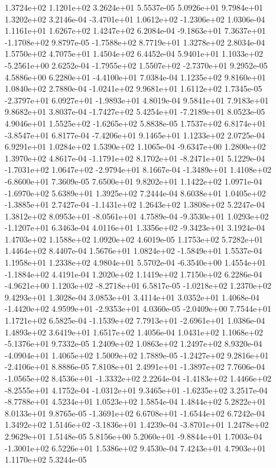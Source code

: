 1.3724e+02 1.1201e+02 3.2624e+01  5.5537e-05
5.0926e+01 9.7984e+01 1.3202e+02  3.2146e-04
-3.4701e+01  1.0612e+02 -1.2306e+02  1.0306e-04
1.1161e+01 1.6267e+02 1.4247e+02  6.2084e-04
-9.1863e+01  7.3637e+01 -1.1708e+02  9.8797e-05
-1.7588e+02  8.7719e+01  1.3278e+02  2.8034e-04
1.5750e+02 4.7075e+01 1.4504e+02  6.4452e-04
 5.9401e+01  1.1033e+02 -5.2561e+00  2.6252e-04
-1.7955e+02  1.5507e+02 -2.7370e+01  9.2952e-05
 4.5886e+00  6.2280e+01 -4.4100e+01  7.0384e-04
1.1235e+02 9.8160e+01 1.0840e+02  2.7880e-04
-1.0241e+02  9.9681e+01  1.6112e+02  1.7345e-05
-2.3797e+01  6.0927e+01 -1.9893e+01  4.8019e-04
9.5841e+01 7.9183e+01 9.8682e+01  3.8037e-04
-1.7427e+02  5.4254e+01 -7.2189e+01  8.0523e-05
 4.9046e+01  1.5525e+02 -1.6265e+02  5.8838e-05
 1.7537e+02  6.8174e+01 -3.8547e+01  6.8177e-04
-7.4206e+01  9.1465e+01  1.1233e+02  2.0725e-04
6.9291e+01 1.0284e+02 1.5390e+02  1.1065e-04
-9.6347e+00  1.2800e+02  1.3970e+02  4.8617e-04
-1.1791e+02  8.1702e+01 -8.2471e+01  5.1229e-04
-1.7031e+02  1.0647e+02 -2.9794e+01  8.1667e-04
-1.3489e+01  1.4108e+02 -6.8600e+01  7.3609e-05
7.6500e+01 9.8202e+01 1.1422e+02  1.0971e-04
-1.6970e+02  5.6389e+01  1.3925e+02  7.2444e-04
 8.6038e+01  1.0405e+02 -1.3885e+01  2.7427e-04
-1.1431e+02  1.2643e+02  1.3808e+02  5.2247e-04
 1.3812e+02  8.0953e+01 -8.0561e+01  4.7589e-04
-9.3530e+01  1.0293e+02 -1.1207e+01  6.3463e-04
 4.0116e+01  1.3356e+02 -9.3423e+01  3.1924e-04
1.4703e+02 1.1588e+02 1.0920e+02  4.6019e-05
1.1753e+02 5.7282e+01 1.4464e+02  8.4407e-04
 1.5676e+01  1.0824e+02 -1.5849e+01  1.5537e-04
1.1958e+01 1.2338e+02 4.9804e+01  5.5702e-04
-6.3540e+00  1.4554e+01 -1.1884e+02  4.4191e-04
1.2020e+02 1.1419e+02 1.7150e+02  6.2286e-04
-4.9621e+00  1.1203e+02 -8.2718e+01  6.5817e-05
-1.0218e+02  1.2370e+02  9.4293e+01  1.3028e-04
3.0853e+01 3.4114e+01 3.0352e+01  1.4068e-04
-1.4420e+02  4.9599e+01 -2.9353e+01  4.0360e-05
-2.0409e+00  7.7544e+01  1.1721e+02  6.5825e-04
-1.1539e+02  7.7913e+01 -2.6961e+01  1.0386e-04
1.4893e+02 3.6419e+01 1.6517e+02  1.4056e-04
 1.0431e+02  1.1068e+02 -5.1376e+01  9.7332e-05
1.2409e+02 1.0863e+02 1.2497e+02  8.9320e-04
-4.0904e+01  1.4065e+02  1.5009e+02  1.7889e-05
-1.2427e+02  9.2816e+01 -2.4106e+01  8.8886e-05
 7.8108e+01  2.4991e+01 -1.3897e+02  7.7606e-04
-1.0565e+02  8.4536e+01 -1.3332e+02  2.2264e-04
-1.4183e+02  1.4466e+02 -8.2555e+01  4.1752e-04
-1.0312e+01  9.3465e+01 -1.6235e+02  3.2517e-04
-8.7788e+01  4.5234e+01  1.0523e+02  1.5854e-04
1.4844e+02 5.2822e+01 8.0133e+01  9.8765e-05
-1.3691e+02  6.6708e+01 -1.6544e+02  6.7242e-04
 1.3492e+02  1.5146e+02 -3.1836e+01  1.4239e-04
-3.8701e+01  1.2478e+02  2.9629e+01  1.5148e-05
 5.8156e+00  5.2060e+01 -9.8844e+01  1.7003e-04
-1.3001e+02  6.5226e+01  1.5386e+02  9.4530e-04
7.4243e+01 4.7903e+01 1.1170e+02  5.3244e-05

